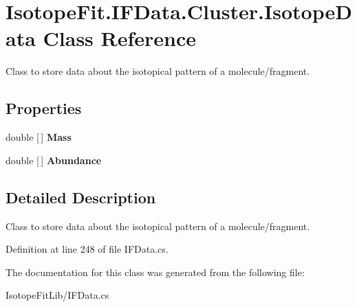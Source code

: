 \hypertarget{class_isotope_fit_1_1_i_f_data_1_1_cluster_1_1_isotope_data}{}\section{Isotope\+Fit.\+I\+F\+Data.\+Cluster.\+Isotope\+Data Class Reference}
\label{class_isotope_fit_1_1_i_f_data_1_1_cluster_1_1_isotope_data}


Class to store data about the isotopical pattern of a molecule/fragment.  


\subsection*{Properties}
\begin{DoxyCompactItemize}
\item 
\mbox{\label{class_isotope_fit_1_1_i_f_data_1_1_cluster_1_1_isotope_data_afbbe848f60b456135ea622abf0644d1b}} 
double \mbox{[}$\,$\mbox{]} {\bfseries Mass}
\item 
\mbox{\label{class_isotope_fit_1_1_i_f_data_1_1_cluster_1_1_isotope_data_aa0f17487c627ed87bedc9cbd2670fc09}} 
double \mbox{[}$\,$\mbox{]} {\bfseries Abundance}
\end{DoxyCompactItemize}


\subsection{Detailed Description}
Class to store data about the isotopical pattern of a molecule/fragment. 



Definition at line 248 of file I\+F\+Data.\+cs.



The documentation for this class was generated from the following file\+:\begin{DoxyCompactItemize}
\item 
Isotope\+Fit\+Lib/I\+F\+Data.\+cs\end{DoxyCompactItemize}
